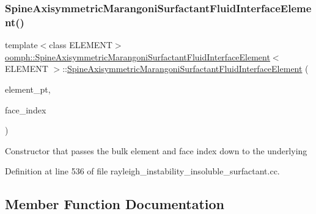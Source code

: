 \subsubsection{\texorpdfstring{Spine\+Axisymmetric\+Marangoni\+Surfactant\+Fluid\+Interface\+Element()}{SpineAxisymmetricMarangoniSurfactantFluidInterfaceElement()}}
{\footnotesize\ttfamily template$<$class E\+L\+E\+M\+E\+NT$>$ \\
\hyperlink{classoomph_1_1SpineAxisymmetricMarangoniSurfactantFluidInterfaceElement}{oomph\+::\+Spine\+Axisymmetric\+Marangoni\+Surfactant\+Fluid\+Interface\+Element}$<$ E\+L\+E\+M\+E\+NT $>$\+::\hyperlink{classoomph_1_1SpineAxisymmetricMarangoniSurfactantFluidInterfaceElement}{Spine\+Axisymmetric\+Marangoni\+Surfactant\+Fluid\+Interface\+Element} (\begin{DoxyParamCaption}\item[{Finite\+Element $\ast$const \&}]{element\+\_\+pt,  }\item[{const int \&}]{face\+\_\+index }\end{DoxyParamCaption})\hspace{0.3cm}{\ttfamily [inline]}}

Constructor that passes the bulk element and face index down to the underlying 

Definition at line 536 of file rayleigh\+\_\+instability\+\_\+insoluble\+\_\+surfactant.\+cc.



\subsection{Member Function Documentation}
\mbox{\label{classoomph_1_1SpineAxisymmetricMarangoniSurfactantFluidInterfaceElement_a56c90572b8969dff01a4baa9de850d91}} 
